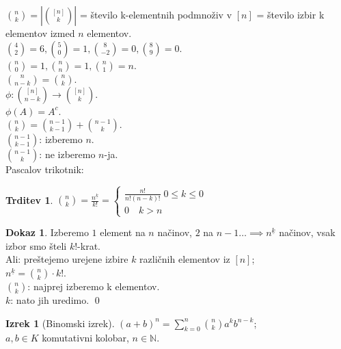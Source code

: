 \documentclass[a4paper, 12pt]{book}
\theoremstyle{definition}
\newtheorem{claim}[counter]{Trditev}
\newtheorem{theorem}[counter]{Izrek}
\newtheorem{pro}[counter]{Dokaz}
\theoremstyle{remark}
\newcommand{\N}{\mathbb{N}}
\begin{document}
$\binom{n}{k} = \left|\binom{[n]}{k}\right|$ = število k-elementnih podmnoživ v $[n]$
= število izbir k elementov izmed $n$ elementov. \\
$\binom{4}{2} = 6, \binom{5}{0} = 1, \binom{8}{-2} = 0, \binom{8}{9} = 0$. \\
$\binom{n}{0} = 1, \binom{n}{n} = 1, \binom{n}{1} = n$. \\
$\binom{n}{n-k} = \binom{n}{k}$. \\
$\phi: \binom{[n]}{n-k} \to \binom{[n]}{k}$. \\
$\phi(A) = A^c$. \\
$\binom{n}{k} = \binom{n-1}{k-1} + \binom{n-1}{k}$. \\
$\binom{n-1}{k-1}$: izberemo $n$. \\
$\binom{n-1}{k}$: ne izberemo $n$-ja. \\
Pascalov trikotnik: \\
\begin{claim}
  $\binom{n}{k} = \frac{n^{\underline{k}}}{k!} = \begin{cases}
    \frac{n!}{n! (n-k)!} \; 0 \leq k \leq 0 \\
    0 \quad k > n
  \end{cases}$
\end{claim}
\begin{pro}
  Izberemo $1$ element na $n$ načinov, $2$ na $n-1 \dots \implies n^{\underline{k}}$ načinov,
  vsak izbor smo šteli $k!$-krat. \\
  Ali: preštejemo urejene izbire $k$ različnih elementov iz $[n]$; \\
  $n^{\underline{k}} = \binom{n}{k} \cdot k!$. \\
  $\binom{n}{k}$: najprej izberemo k elementov. \\
  $k$: nato jih uredimo.
  \qed
\end{pro}
\begin{theorem}[Binomski izrek]
  $(a+b)^n = \sum_{k=0}^{n} \binom{n}{k} a^k b^{n-k}$; \\
  $a,b \in K$ komutativni kolobar, $n \in \N$.
\end{theorem}
\end{document}
